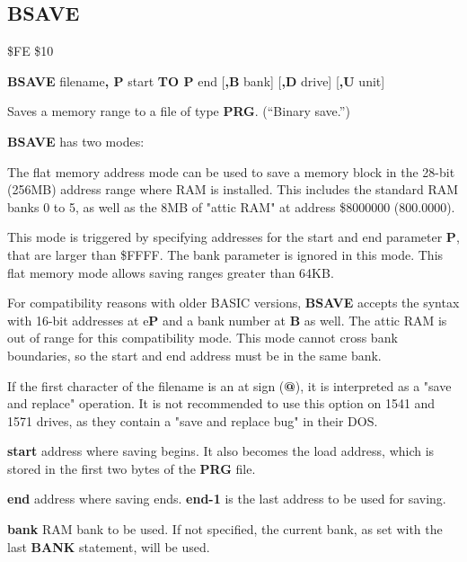 \subsection{BSAVE}
\begin{description}[leftmargin=2cm,style=nextline]
\item [Token:]    \$FE \$10

\item [Format:]   {\bf BSAVE} filename{\bf, P} start {\bf TO P} end [{\bf,B} bank] [{\bf,D} drive] [{\bf,U} unit]

\item [Usage:]    Saves a memory range to a file of type {\bf PRG}. (``Binary save.'')

                  {\bf BSAVE} has two modes:

                  The flat memory address mode can be used to save a memory block in the 28-bit (256MB) address range where RAM is installed. This includes the standard RAM banks 0 to 5, as well as the 8MB of "attic RAM" at address \$8000000 (800.0000).

                  This mode is triggered by specifying addresses for the start and end parameter {\bf P}, that are larger than \$FFFF. The bank parameter is ignored in this mode. This flat memory mode allows saving ranges greater than 64KB.

                  For compatibility reasons with older BASIC versions, {\bf BSAVE} accepts the syntax with 16-bit addresses at e{\bf P} and a bank number at {\bf B} as well. The attic RAM is out of range for this compatibility mode. This mode cannot cross bank boundaries, so the start and end address must be in the same bank.

                  \filenamedefinition

                  If the first character of the filename is an at sign ({\bf @}), it is interpreted as a "save and replace" operation. It is not recommended to use this option on 1541 and 1571 drives, as they contain a "save and replace bug" in their DOS.

                  {\bf start} address where saving begins. It also becomes the load address, which is stored in the first two bytes of the {\bf PRG} file.

                  {\bf end} address where saving ends. {\bf end-1} is the last address to be used for saving.

                  {\bf bank} RAM bank to be used. If not specified, the current bank, as set with the last {\bf BANK} statement, will be used.


\end{description}
